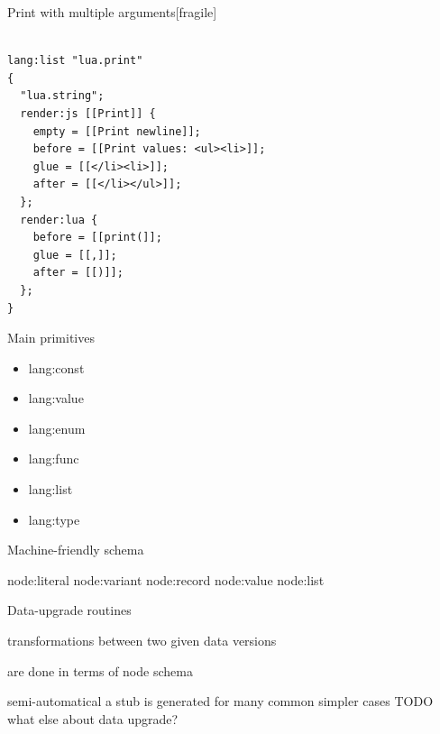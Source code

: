 \documentclass[handout]{beamer}
\begin{document}

\begin{frame}{Print with multiple arguments}[fragile]

\begin{verbatim}

lang:list "lua.print"
{
  "lua.string";
  render:js [[Print]] {
    empty = [[Print newline]];
    before = [[Print values: <ul><li>]];
    glue = [[</li><li>]];
    after = [[</li></ul>]];
  };
  render:lua {
    before = [[print(]];
    glue = [[,]];
    after = [[)]];
  };
}
\end{verbatim}

\end{frame}


\begin{frame}{Main primitives}

\begin{itemize}
\item lang:const
\item lang:value
\item lang:enum
\item lang:func
\item lang:list
\item lang:type
\end{itemize}

\end{frame}


\begin{frame}{Machine-friendly schema}

\begin{itemize}
node:literal
node:variant
node:record
node:value
node:list
\end{itemize}

\end{frame}


Data-upgrade routines

\item transformations between two given data versions
\item are done in terms of node schema
\item semi-automatical a stub is generated for many common simpler cases
TODO what else about data upgrade?
\end{document}
